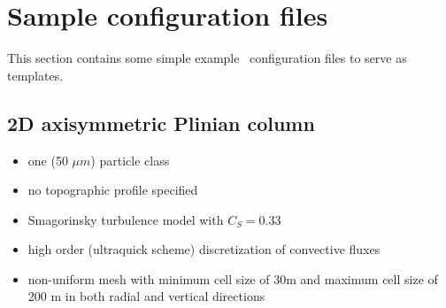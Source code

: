 \section{Sample configuration files}
\label{section:input_sample}
This section contains some simple example \PDAC\ configuration files to serve
as templates.
\prettypar
\subsection{2D axisymmetric Plinian column}
\begin{itemize}
\item one (50 $\mu m$) particle class
\item no topographic profile specified
\item Smagorinsky turbulence model with $C_S=0.33$
\item high order (ultraquick scheme) discretization of convective fluxes
\item non-uniform mesh with minimum cell size of 30m and maximum cell size
      of 200 m in both radial and vertical directions
\end{itemize}

